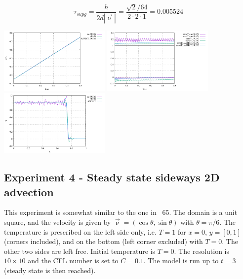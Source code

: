 


\[
\tau_{supg} = \frac{h}{2 d |\vec{\upnu}|} = \frac{\sqrt{2}/64}{2 \cdot 2 \cdot 1} = 0.005524
\]

\begin{center}
\includegraphics[width=5.4cm]{python_codes/fieldstone_43/results/experiment3/Q2/avrg_T.pdf}
\includegraphics[width=5.4cm]{python_codes/fieldstone_43/results/experiment3/Q2/stats_T.pdf}
\includegraphics[width=5.4cm]{python_codes/fieldstone_43/results/experiment3/Q2/temperature.pdf}
\end{center}




\subsection*{Experiment 4 - Steady state sideways 2D advection}

This experiment is somewhat similar to the one in \stone~65.
The domain is a unit square, and the velocity is given 
by $\vec\upnu=(\cos \theta, \sin\theta)$ with $\theta=\pi/6$.
The temperature is prescribed on the left side only, i.e. $T=1$ for $x=0$, $y=[0,1]$ 
(corners included), and 
on the bottom (left corner excluded) with $T=0$. The other two sides 
are left free. Initial temperature is $T=0$.
The resolution is $10\times10$ and the CFL number is set to $C=0.1$. 
The model is run up to $t=3$ (steady state is then reached). 

